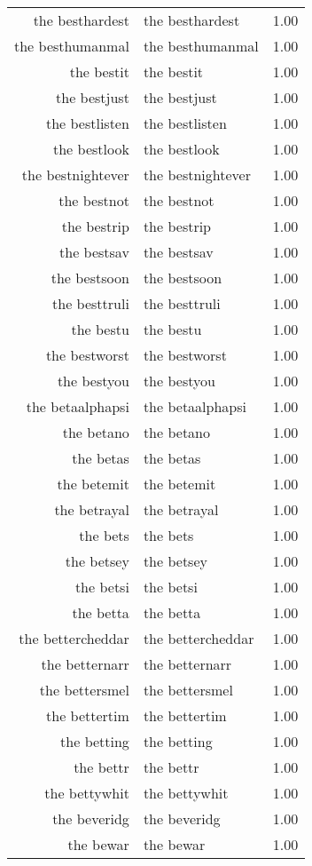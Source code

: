 \begin{table}[ht]
\begin{tabular}{rlr}
  the besthardest & the besthardest & 1.00 \\ 
  the besthumanmal & the besthumanmal & 1.00 \\ 
  the bestit & the bestit & 1.00 \\ 
  the bestjust & the bestjust & 1.00 \\ 
  the bestlisten & the bestlisten & 1.00 \\ 
  the bestlook & the bestlook & 1.00 \\ 
  the bestnightever & the bestnightever & 1.00 \\ 
  the bestnot & the bestnot & 1.00 \\ 
  the bestrip & the bestrip & 1.00 \\ 
  the bestsav & the bestsav & 1.00 \\ 
  the bestsoon & the bestsoon & 1.00 \\ 
  the besttruli & the besttruli & 1.00 \\ 
  the bestu & the bestu & 1.00 \\ 
  the bestworst & the bestworst & 1.00 \\ 
  the bestyou & the bestyou & 1.00 \\ 
  the betaalphapsi & the betaalphapsi & 1.00 \\ 
  the betano & the betano & 1.00 \\ 
  the betas & the betas & 1.00 \\ 
  the betemit & the betemit & 1.00 \\ 
  the betrayal & the betrayal & 1.00 \\ 
  the bets & the bets & 1.00 \\ 
  the betsey & the betsey & 1.00 \\ 
  the betsi & the betsi & 1.00 \\ 
  the betta & the betta & 1.00 \\ 
  the bettercheddar & the bettercheddar & 1.00 \\ 
  the betternarr & the betternarr & 1.00 \\ 
  the bettersmel & the bettersmel & 1.00 \\ 
  the bettertim & the bettertim & 1.00 \\ 
  the betting & the betting & 1.00 \\ 
  the bettr & the bettr & 1.00 \\ 
  the bettywhit & the bettywhit & 1.00 \\ 
  the beveridg & the beveridg & 1.00 \\ 
  the bewar & the bewar & 1.00 \\ 

\end{tabular}
\end{table}
